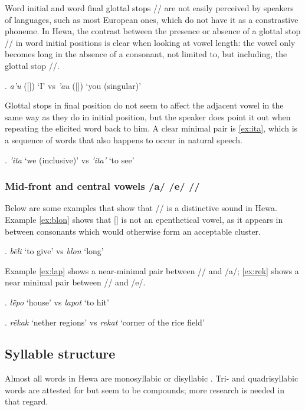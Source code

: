 \documentclass{article}
\begin{document}
Word initial and word final glottal stops /\textglotstop / are not easily perceived by speakers of languages, such as most European ones, which do not have it as a constrastive phoneme. In Hewa, the contrast between the presence or absence of a glottal stop /\textglotstop / in word initial positions is clear when looking at vowel length: the vowel only becomes long in the absence of a consonant, not limited to, but including, the glottal stop /\textglotstop /.

\ex. \textit{a'u} ([]) `I' vs \textit{'au} ([]) `you (singular)'

Glottal stops in final position do not seem to affect the adjacent vowel in the same way as they do in initial position, but the speaker does point it out when repeating the elicited word back to him. A clear minimal pair is \ref{ex:ita}, which is a sequence of words that also happens to occur in natural speech.

\ex. \label{ex:ita} \textit{'ita} `we (inclusive)' vs \textit{'ita'} `to see'

\subsubsection{Mid-front and central vowels /a/ /e/ /\textschwa/}

Below are some examples that show that /\textschwa / is a distinctive sound in Hewa. Example \ref{ex:blon} shows that [\textschwa] is not an epenthetical vowel, as it appears in between consonants which would otherwise form an acceptable cluster.

\ex. \label{ex:blon} \textit{bëli} `to give' vs \textit{blon} `long'

Example \ref{ex:lap} shows a near-minimal pair between /\textschwa / and /a/; \ref{ex:rek} shows a near minimal pair between /\textschwa / and /e/.

\ex. \label{ex:lap} \textit{lëpo} `house' vs \textit{lapot} `to hit'

\ex. \label{ex:rek} \textit{rëkak} `nether regions' vs \textit{rekat} `corner of the rice field'

\subsection{Syllable structure}\label{sec:syl}


Almost all words in Hewa are monosyllabic or disyllabic . Tri- and quadrisyllabic words are attested for but seem to be compounds; more research is needed in that regard. 
\end{document}

